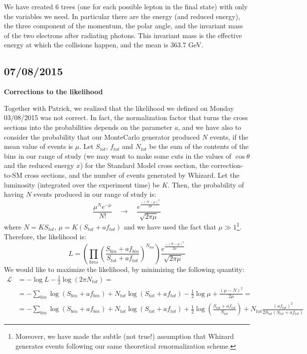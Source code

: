 We have created 6 trees (one for each possible lepton in the final state) with only the variables we need. In particular there are the energy (and reduced energy), the three component of the momentum, the polar angle, and the invariant mass of the two electrons after radiating photons. This invariant mass is the effective energy at which the collisions happen, and the mean is 363.7 GeV. 

\subsection{07/08/2015}

\textbf{Corrections to the likelihood}

Together with Patrick, we realized that the likelihood we defined on Monday 03/08/2015 was not correct. In fact, the normalization factor that turns the cross sections into the probabilities depends on the parameter $a$, and we have also to consider the probability that our MonteCarlo generator produced $N$ events, if the mean value of events is $\mu$.
Let $S_{tot}$, $f_{tot}$ and $N_{tot}$ be the sum of the contents of the bins in our range of study (we may want to make some cuts in the values of $\cos\theta$ and the reduced energy $x$) for the Standard Model cross section, the correction-to-SM cross sections, and the number of events generated by Whizard. Let the luminosity (integrated over the experiment time) be $K$. Then, the probability of having $N$ events produced in our range of study is:
\[
\frac{\mu^Ne^{-\mu}}{N!} \quad\rightarrow\quad \frac{e^{\frac{-(N-\mu)^2}{2\mu}}}{\sqrt{2\pi\mu}}
\]
where $N=KS_{tot}$, $\mu = K(S_{tot}+af_{tot})$ and we have used the fact that $\mu \gg 1$\footnote{Moreover, we have made the subtle (not true!) assumption that Whizard generates events following our same theoretical renormalization scheme.}.
Therefore, the likelihood is:
\[
L = \left(\prod_{bins}\left(\frac{S_{bin}+af_{bin}}{S_{tot}+af_{tot}}\right)^{N_{bin}}\right)\frac{e^{\frac{-(N-\mu)^2}{2\mu}}}{\sqrt{2\pi\mu}}
\]
We would like to maximize the likelihood, by minimizing the following quantity:
\begin{equation}
\begin{split}
\mathcal{L} &= -\log L -\frac{1}{2}\log(2\pi N_{tot}) =\\
&=- \sum_{bin}\log(S_{bin}+af_{bin})+N_{tot}\log(S_{tot}+af_{tot})-\frac{1}{2}\log\mu+\frac{(\mu-N)^2}{2\mu} =\\
&=- \sum_{bin}\log(S_{bin}+af_{bin})+N_{tot}\log(S_{tot}+af_{tot})+\frac{1}{2}\log\left(\frac{S_{tot}+af_{tot}}{S_{tot}}\right)+N_{tot}\frac{(af_{tot})^2}{2S_{tot}(S_{tot}+af_{tot})}
\end{split}
\end{equation}

